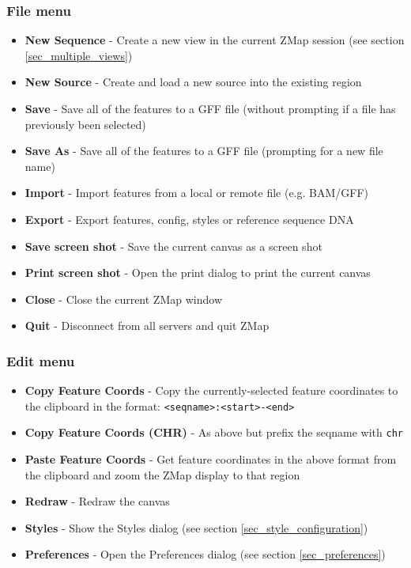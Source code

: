 \documentclass[letterpaper]{article}
\begin{document}
\subsubsection{File menu}
\begin{itemize}
\item \textbf{New Sequence} - Create a new view in the current ZMap session (see section \ref{sec_multiple_views})
\item \textbf{New Source} - Create and load a new source into the existing region
\item \textbf{Save} - Save all of the features to a GFF file (without prompting if a file has previously been selected)
\item \textbf{Save As} - Save all of the features to a GFF file (prompting for a new file name)
\item \textbf{Import} - Import features from a local or remote file (e.g. BAM/GFF)
\item \textbf{Export} - Export features, config, styles or reference sequence DNA
\item \textbf{Save screen shot} - Save the current canvas as a screen shot
\item \textbf{Print screen shot} - Open the print dialog to print the current canvas
\item \textbf{Close} - Close the current ZMap window
\item \textbf{Quit} - Disconnect from all servers and quit ZMap
\end{itemize}

\subsubsection{Edit menu}
\begin{itemize}
\item \textbf{Copy Feature Coords} - Copy the currently-selected feature coordinates to the clipboard in the format: \lstinline{<seqname>:<start>-<end>}
\item \textbf{Copy Feature Coords (CHR)} - As above but prefix the seqname with \lstinline{chr}
\item \textbf{Paste Feature Coords} - Get feature coordinates in the above format from the clipboard and zoom the ZMap display to that region
\item \textbf{Redraw} - Redraw the canvas
\item \textbf{Styles} - Show the Styles dialog (see section \ref{sec_style_configuration})
\item \textbf{Preferences} - Open the Preferences dialog (see section \ref{sec_preferences})
\end{itemize}
\end{document}
